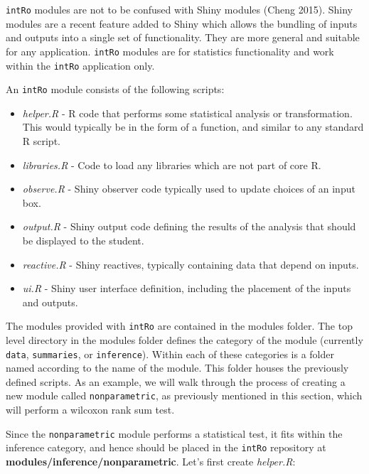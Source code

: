 \documentclass[12pt,]{article}
\providecommand{\tightlist}{%
  \setlength{\itemsep}{0pt}\setlength{\parskip}{0pt}}
\begin{document}
\texttt{intRo} modules are not to be confused with Shiny modules (Cheng
2015). Shiny modules are a recent feature added to Shiny which allows
the bundling of inputs and outputs into a single set of functionality.
They are more general and suitable for any application. \texttt{intRo}
modules are for statistics functionality and work within the
\texttt{intRo} application only.

An \texttt{intRo} module consists of the following scripts:

\begin{itemize}
\tightlist
\item
  \emph{helper.R} - R code that performs some statistical analysis or
  transformation. This would typically be in the form of a function, and
  similar to any standard R script.
\item
  \emph{libraries.R} - Code to load any libraries which are not part of
  core R.
\item
  \emph{observe.R} - Shiny observer code typically used to update
  choices of an input box.
\item
  \emph{output.R} - Shiny output code defining the results of the
  analysis that should be displayed to the student.
\item
  \emph{reactive.R} - Shiny reactives, typically containing data that
  depend on inputs.
\item
  \emph{ui.R} - Shiny user interface definition, including the placement
  of the inputs and outputs.
\end{itemize}

The modules provided with \texttt{intRo} are contained in the modules
folder. The top level directory in the modules folder defines the
category of the module (currently \texttt{data}, \texttt{summaries}, or
\texttt{inference}). Within each of these categories is a folder named
according to the name of the module. This folder houses the previously
defined scripts. As an example, we will walk through the process of
creating a new module called \texttt{nonparametric}, as previously
mentioned in this section, which will perform a wilcoxon rank sum test.

Since the \texttt{nonparametric} module performs a statistical test, it
fits within the inference category, and hence should be placed in the
\texttt{intRo} repository at \textbf{modules/inference/nonparametric}.
Let's first create \emph{helper.R}:
\end{document}
